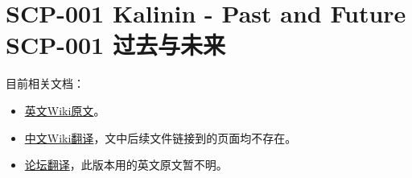 \chapter[SCP-001 过去与未来]{
	SCP-001 Kalinin - Past and Future \\
	SCP-001 过去与未来
}

\label{chap:SCP-001.past.and.future}


\hr

目前相关文档：

\begin{itemize}
\item \href{http://scp-wiki.wikidot.com/kalinins-proposal}{英文Wiki原文}。
\item \href{http://scp-wiki-cn.wikidot.com/kalinins-proposal}{中文Wiki翻译}，文中后续文件链接到的页面均不存在。
\item \href{http://bbs.scp-wiki-cn.org/posts/list/27826.page}{论坛翻译}，此版本用的英文原文暂不明。
\end{itemize}
